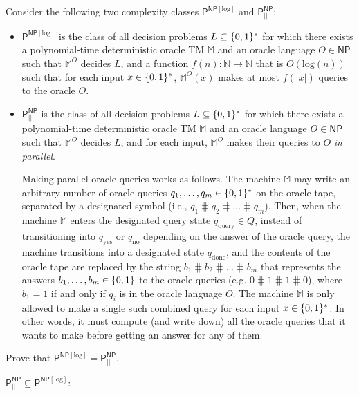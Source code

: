 \begin{question}
    Consider the following two complexity classes $\mathsf{P}^{\mathsf{NP}[\text{log}]}$ and $\mathsf{P}_{||}^{\mathsf{NP}}$:

    \begin{itemize}
        \item $\mathsf{P}^{\mathsf{NP}[\text{log}]}$ is the class of all decision problems $L \subseteq \{0, 1\}^*$ for which there exists a polynomial-time deterministic oracle TM $\mathbb{M}$ and an oracle language $O \in \mathsf{NP}$ such that $\mathbb{M}^O$ decides $L$, and a function $f(n): \mathbb{N} \to \mathbb{N}$ that is $O(\text{log}(n))$ such that for each input $x \in \{0, 1\}^*$, $\mathbb{M}^O(x)$ makes at most $f(|x|)$ queries to the oracle $O$.
        \item $\mathsf{P}_{||}^{\mathsf{NP}}$ is the class of all decision problems $L \subseteq \{0, 1\}^*$ for which there exists a polynomial-time deterministic oracle TM $\mathbb{M}$ and an oracle language $O \in \mathsf{NP}$ such that $\mathbb{M}^O$ decides $L$, and for each input, $\mathbb{M}^O$ makes their queries to $O$ \textit{in parallel}.

        Making parallel oracle queries works as follows. The machine $\mathbb{M}$ may write an arbitrary number of oracle queries $q_1, \ldots, q_m \in \{0, 1\}^*$ on the oracle tape, separated by a designated symbol \hash (i.e., $q_1\hash q_2 \hash \ldots \hash q_m$). Then, when the machine $\mathbb{M}$ enters the designated query state $q_{\text{query}} \in Q$, instead of transitioning into $q_{\text{yes}}$ or $q_{\text{no}}$ depending on the answer of the oracle query, the machine transitions into a designated state $q_{\text{done}}$, and the contents of the oracle tape are replaced by the string $b_1 \hash b_2 \hash \ldots \hash b_m$ that represents the answers $b_1, \ldots, b_m \in \{0,1\}$ to the oracle queries (e.g. $0 \hash 1 \hash 1 \hash 0$), where $b_1 = 1$ if and only if $q_i$ is in the oracle language $O$. The machine $\mathbb{M}$ is only allowed to make a single such combined query for each input $x \in \{0, 1\}^*$. In other words, it must compute (and write down) all the oracle queries that it wants to make before getting an answer for any of them.
\end{itemize}

Prove that $\mathsf{P}^{\mathsf{NP}[\text{log}]} = \mathsf{P}_{||}^{\mathsf{NP}}$.

\begin{answer}
    $\mathsf{P}_{||}^{\mathsf{NP}} \subseteq \mathsf{P}^{\mathsf{NP}[\text{log}]}:$


\end{answer}
\end{question}
